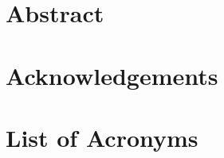 \documentclass[12pt,twoside,a4paper,openright]{book}
\begin{document}

\renewcommand{\bibname}{References}
\renewcommand{\contentsname}{Table of Contents}

\newcommand{\TIL}{Troms{\o} IL\xspace}
\newcommand{\s}[1]{Section~\ref{#1}}
\newcommand{\f}[1]{Fig.~\ref{#1}}
\renewcommand{\t}[1]{Table~\ref{#1}}

\newcommand{\Section}[1]{%
 \section {#1}
 \label {sec:#1}
 \acresetall%
}

\newcommand{\Subsection}[1]{%
 \subsection {#1}
 \label {sec:#1}%
}
\newcommand{\PdfImage}[2]{%
 \begin{figure}
  \centering
  \texttt{[image: images]}
  \caption{#2}
  \label{pdf:#1}
 \end{figure}
} 

\newcommand{\PngImage}[3]{%
 \begin{figure}[H]
  \centering
  \texttt{[image: \#3]}
  \caption{#1}
  \label{png:#2}
 \end{figure}
} 


\pagestyle{empty}

\sloppy

\cleardoublepage
{}
\pagestyle{plain}

\chapter*{Abstract}



\chapter*{Acknowledgements}


%
\setcounter{secnumdepth}{3}
\setcounter{tocdepth}{3}
\tableofcontents	

\chapter*{List of Acronyms}
\begin{acronym}


\end{acronym}
\end{document}
